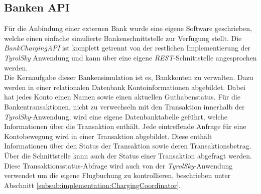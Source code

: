\subsection{Banken API}
\label{subsec:implementation:bankApi}
Für die Anbindung einer externen Bank wurde eine eigene Software geschrieben, welche einen einfache simulierte Bankenschnittstelle zur Verfügung stellt. Die \textit{BankChargingAPI} ist komplett getrennt von der restlichen Implementierung der \textit{TyrolSky} Anwendung und kann über eine eigene \textit{REST}-Schnittstelle angesprochen werden. \\
% 
% 
Die Kernaufgabe dieser Bankensimulation ist es, Bankkonten zu verwalten. Dazu werden in einer relationalen Datenbank Kontoinformationen abgebildet. Dabei hat jedes Konto einen Namen sowie einen aktuellen Guthabenstatus. Für die Bankentransaktionen, nicht zu verwechseln mit den Transaktion innerhalb der \textit{TyrolSky}-Anwendung, wird eine eigene Datenbanktabelle geführt, welche Informationen über die Transaktion enthält. Jede eintreffende Anfrage für eine Kontobewegung wird in einer Transaktion abgebildet. Diese enthält Informationen über den Status der Transaktion sowie deren Transaktionsbetrag. Über die Schnittstelle kann auch der Status einer Transaktion abgefragt werden. Diese Transaktionsstatus-Abfrage wird auch von der \textit{TyrolSky}-Anwendung verwendet um die eigene Flugbuchung zu kontrollieren, beschrieben unter Abschnitt \ref{subsub:implementation:ChargingCoordinator}. \\
